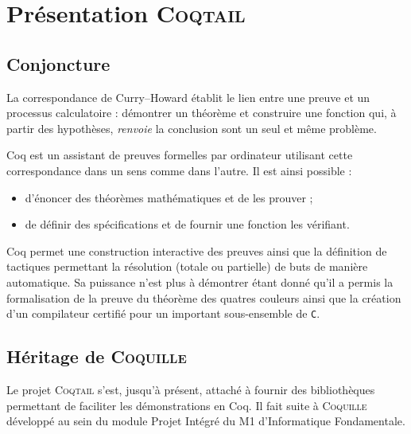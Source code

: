 \documentclass[11pt]{article}
\newcommand{\coqtail}{\textsc{Coqtail}}
\newcommand{\coquille}{\textsc{Coquille}}
\begin{document}


\section{Présentation \coqtail{}}


\subsection{Conjoncture}

La correspondance de Curry--Howard établit le lien entre une preuve et un processus calculatoire : démontrer un théorème et construire une fonction qui, à partir des hypothèses, \emph{renvoie} la conclusion sont un seul et même problème.

Coq\cite{L:BC04} est un assistant de preuves formelles par ordinateur utilisant cette correspondance dans un sens comme dans l'autre. Il est ainsi possible :
\begin{itemize}
  \item d'énoncer des théorèmes mathématiques et de les prouver ;
  \item de définir des spécifications et de fournir une fonction les vérifiant.
\end{itemize}

Coq permet une construction interactive des preuves ainsi que la définition de tactiques permettant la résolution (totale ou partielle) de buts de manière automatique. Sa puissance n'est plus à démontrer étant donné qu'il a permis la formalisation de la preuve du théorème des quatres couleurs\cite{Gonthier07} ainsi que la création d'un compilateur certifié pour un important sous-ensemble de \texttt{C}\cite{compcert}.

\subsection{Héritage de \coquille{}}

Le projet \coqtail{} s'est, jusqu'à présent, attaché à fournir des bibliothèques permettant de faciliter les démonstrations en Coq. Il fait suite à \coquille{} développé au sein du module Projet Intégré du M1 d'Informatique Fondamentale.
\end{document}
